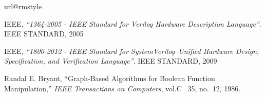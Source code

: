 \begin{thebibliography}{10}
\providecommand{\url}[1]{#1}
\csname url@rmstyle\endcsname
\providecommand{\newblock}{\relax}
\providecommand{\bibinfo}[2]{#2}
\providecommand\BIBentrySTDinterwordspacing{\spaceskip=0pt\relax}
\providecommand\BIBentryALTinterwordstretchfactor{4}
\providecommand\BIBentryALTinterwordspacing{\spaceskip=\fontdimen2\font plus
\BIBentryALTinterwordstretchfactor\fontdimen3\font minus
  \fontdimen4\font\relax}
\providecommand\BIBforeignlanguage[2]{{%
\expandafter\ifx\csname l@#1\endcsname\relax
\typeout{** WARNING: IEEEtran.bst: No hyphenation pattern has been}%
\typeout{** loaded for the language `#1'. Using the pattern for}%
\typeout{** the default language instead.}%
\else
\language=\csname l@#1\endcsname
\fi
#2}}

  IEEE,
  \emph{``1364-2005 - IEEE Standard for Verilog Hardware Description
  Language''}.
	IEEE STANDARD,
	2005

  IEEE,
	\emph{``1800-2012 - IEEE Standard for SystemVerilog--Unified Hardware Design,
  Specification, and Verification Language''}.
	IEEE STANDARD,
	2009

Randal E. Bryant,
  ``Graph-Based Algorithms for Boolean Function Manipulation,'' \emph{IEEE Transactions on Computers}, vol.C ~35, no.~12, 1986.


\end{thebibliography}

